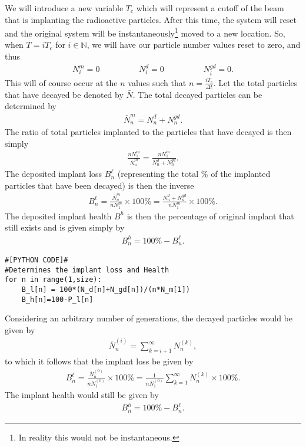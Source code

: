 We will introduce a new variable $T_c$ which will represent a cutoff of the beam that is implanting the radioactive particles. After this time, the system will reset and the original system will be instantaneously\footnote{In reality this would not be instantaneous.} moved to a new location. So, when $T=iT_c$ for $i\in\mathbb{N}$, we will have our particle number values reset to zero, and thus
\begin{align}
N^m_i = 0 \hspace{2cm} N^d_i =0 \hspace{2cm} N^{gd}_i =0.
\end{align}
This will of course occur at the $n$ values such that $n=\frac{iT_c}{\Delta t}$. Let the total particles that have decayed be denoted by $\bar{N}$. The total decayed particles can be determined by
\begin{align}
\bar{N}^m_n=N^d_n+N^{gd}_n.
\end{align}
The ratio of total particles implanted to the particles that have decayed is then simply
\begin{align}
\frac{nN^m_1}{\bar{N}^m_n} = \frac{nN^m_1}{N^d_n+N^{gd}_n}.
\end{align}
The deposited implant loss $B^\ell_n$ (representing the total \% of the implanted particles that have been decayed) is then the inverse
\begin{align}
B^\ell_n=\frac{\bar{N}^m_n}{nN^m_1}\times 100\% = \frac{N^d_n+N^{gd}_n}{nN^m_1} \times 100\%.
\end{align}
The deposited implant health $B^h$ is then the percentage of original implant that still exists and is given simply by
\begin{align}
B^h_n = 100 \% - B^\ell_n.
\end{align}
\begin{lstlisting}
#[PYTHON CODE]#
#Determines the implant loss and Health
for n in range(1,size):
	B_l[n] = 100*(N_d[n]+N_gd[n])/(n*N_m[1])
	B_h[n]=100-P_l[n]
\end{lstlisting}

\begin{Addition}
	Considering an arbitrary number of generations, the decayed particles would be given by
	\begin{align}
	\bar{N}^{(i)}_n = \sum_{k=i+1}^{\infty} N^{(k)}_n,
	\end{align} 
	to which it follows that the implant loss be given by
	\begin{align}
	B^\ell_n=\frac{\bar{N}^{(0)}_n}{nN^{(0)}_1}\times 100\% = \frac{1}{nN^{(0)}_1}\sum_{k=1}^{\infty} N^{(k)}_n \times 100\%.
	\end{align}
	The implant health would still be given by
	\begin{align}
	B^h_n = 100 \% - B^\ell_n.
	\end{align}
\end{Addition}